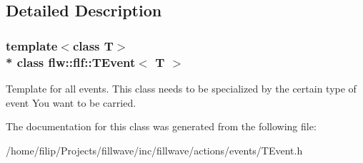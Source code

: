 \subsection{Detailed Description}
\subsubsection*{template$<$class T$>$\\*
class flw\+::flf\+::\+T\+Event$<$ T $>$}

Template for all events. This class needs to be specialized by the certain type of event You want to be carried. 

The documentation for this class was generated from the following file\+:\begin{DoxyCompactItemize}
\item 
/home/filip/\+Projects/fillwave/inc/fillwave/actions/events/T\+Event.\+h\end{DoxyCompactItemize}

